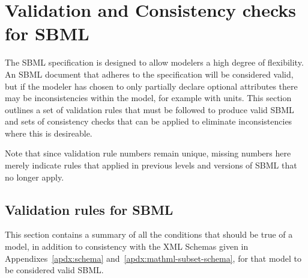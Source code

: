 
\newcommand{\sbmlrule}[1]{\item[#1.]}

\section{Validation and Consistency checks for SBML}
\label{apdx:validation-rules}

The SBML specification is designed to allow modelers a high degree
of flexibility.  An SBML document that adheres to the specification 
will be considered valid, but if the modeler has chosen to only
partially declare optional attributes there may be inconsistencies
within the model, for example with units.  This section outlines a 
set of validation rules that must be followed to produce valid SBML 
and sets of consistency checks that can be applied to eliminate  
inconsistencies where this is desireable.

Note that since validation rule numbers remain unique, missing numbers
here merely indicate rules that applied in previous levels and
versions of SBML that no longer apply.

\subsection{Validation rules for SBML}

This section contains a summary of all the conditions that should
be true of a model, in addition to consistency with the XML
Schemas given in Appendixes~\ref{apdx:schema}
and~\ref{apdx:mathml-subset-schema}, for that model to be considered
valid SBML.


